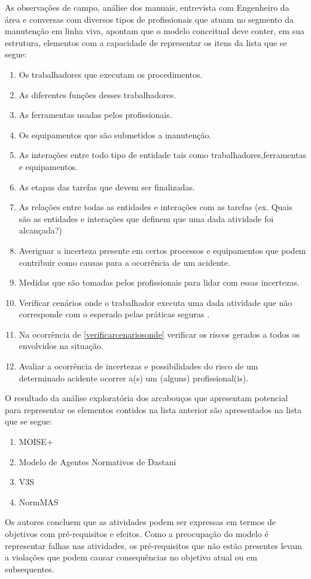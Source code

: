 As observações de campo, análise dos manuais, entrevista com Engenheiro da área e conversas com diversos tipos de profissionais que atuam no segmento da manutenção em linha viva, apontam que o modelo conceitual deve conter, em sua estrutura, elementos com a capacidade de representar os itens da lista que se segue:

\begin{enumerate}
	\item Os trabalhadores que executam os procedimentos.
	\item As diferentes funções desses trabalhadores.
	\item As ferramentas usadas pelos profissionais.
	\item Os equipamentos que são submetidos a manutenção.
	\item As interações entre todo tipo de entidade tais como trabalhadores,ferramentas e equipamentos.
	\item As etapas das tarefas que devem ser finalizadas. 
	\item As relações entre todas as entidades e interações com as tarefas (ex. Quais são as entidades e interações que definem que uma dada atividade foi alcançada?)
	\item Averiguar a incerteza presente em certos processos e equipamentos que podem contribuir como causas para a ocorrência de um acidente.
	\item Medidas que são tomadas pelos profissionais para lidar com essas incertezas.
	\item Verificar cenários onde o trabalhador executa uma dada atividade que não corresponde com o esperado pelas práticas seguras \label{verificarcenariosonde}. 
	\item Na ocorrência de \ref{verificarcenariosonde} verificar os riscos gerados a todos os envolvidos na situação.
	\item Avaliar a ocorrência de incertezas e possibilidades do risco de um determinado acidente ocorrer a(s) um (alguns) profissional(is).
\end{enumerate}

O resultado da análise exploratória dos arcabouços que apresentam potencial para representar os elementos contidos na lista anterior são apresentados na lista que se segue:

\begin{enumerate}
	\item MOISE+ 
	\item Modelo de Agentes Normativos de Dastani
	\item V3S
	\item NormMAS
\end{enumerate}

Os autores concluem que as atividades podem ser expressas em termos de objetivos com pré-requisitos e efeitos. Como a preocupação do modelo é representar falhas nas atividades, os pré-requisitos que não estão presentes levam a violações que podem causar consequências no objetivo atual ou em subsequentes.